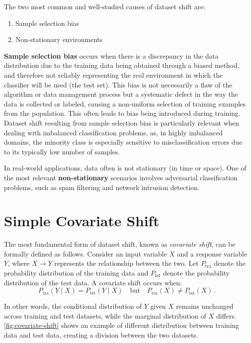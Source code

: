 The two most common and well-studied causes of dataset shift are:

\begin{enumerate}
	\item Sample selection bias
	\item Non-stationary environments
\end{enumerate}

\textbf{Sample selection bias} occurs when there is a discrepancy in the data distribution due to the training data being obtained through a biased method, and therefore not reliably representing the real environment in which the classifier will be used (the test set). This bias is not necessarily a flaw of the algorithm or data management process but a systematic defect in the way the data is collected or labeled, causing a non-uniform selection of training examples from the population. This often leads to bias being introduced during training. Dataset shift resulting from sample selection bias is particularly relevant when dealing with imbalanced classification problems, as, in highly imbalanced domains, the minority class is especially sensitive to misclassification errors due to its typically low number of samples.

In real-world applications, data often is not stationary (in time or space). One of the most relevant \textbf{non-stationary} scenarios involves adversarial classification problems, such as spam filtering and network intrusion detection.
	

\section{Simple Covariate Shift}

The most fundamental form of dataset shift, known as \textit{covariate shift}, can be formally defined as follows. Consider an input variable \( X \) and a response variable \( Y \), where \( X \to Y \) represents the relationship between the two. Let \( P_{\text{tra}} \) denote the probability distribution of the training data and \( P_{\text{tst}} \) denote the probability distribution of the test data. A covariate shift occurs when:  
\[
P_{\text{tra}}(Y \mid X) = P_{\text{tst}}(Y \mid X) \quad \text{but} \quad P_{\text{tra}}(X) \neq P_{\text{tst}}(X)\,.
\]

In other words, the conditional distribution of \( Y \) given \( X \) remains unchanged across training and test datasets, while the marginal distribution of \( X \) differs. \cref{fig:covariate-shift} shows an example of different distribution between training data and test data, creating a division between the two datasets.  
	
